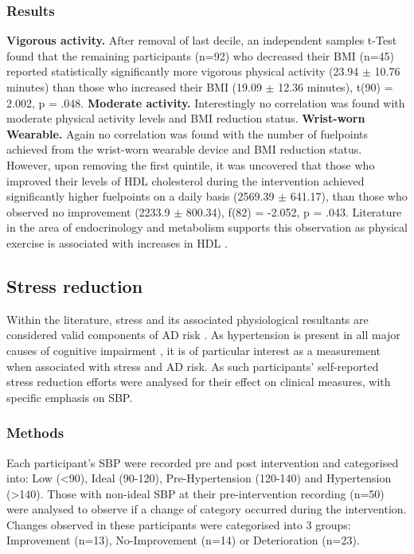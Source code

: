 \subsubsection{Results}
\textbf{Vigorous activity.}
After removal of last decile, an independent samples t-Test found that the remaining participants (n=92) who decreased their BMI (n=45) reported statistically significantly more vigorous physical activity (23.94 $\pm$ 10.76 minutes) than those who increased their BMI (19.09 $\pm$ 12.36 minutes), t(90) = 2.002, p = .048.
\newline \textbf{Moderate activity.}
Interestingly no correlation was found with moderate physical activity levels and BMI reduction status.
\newline \textbf{Wrist-worn Wearable.}
Again no correlation was found with the number of fuelpoints achieved from the wrist-worn wearable device and BMI reduction status.
However, upon removing the first quintile, it was uncovered that those who improved their levels of HDL cholesterol during the intervention achieved significantly higher fuelpoints on a daily basis (2569.39 $\pm$ 641.17), than those who observed no improvement (2233.9 $\pm$ 800.34), f(82) = -2.052, p = .043. Literature in the area of endocrinology and metabolism supports this observation as physical exercise is associated with increases in HDL \cite{Franklin2014}.

\subsection{Stress reduction}
Within the literature, stress and its associated physiological resultants are considered valid components of AD risk \cite{Dotson2010,Royall2012,Boyle2010}. As hypertension is present in all major causes of cognitive impairment \cite{Iadecola2014}, it is of particular interest as a measurement when associated with stress and AD risk. As such participants’ self-reported stress reduction efforts were analysed for their effect on clinical measures, with specific emphasis on SBP.

\subsubsection{Methods}
Each participant’s SBP were recorded pre and post intervention and categorised into: Low (\textless90), Ideal (90-120), Pre-Hypertension (120-140) and Hypertension (\textgreater140). Those with non-ideal SBP at their pre-intervention recording (n=50) were analysed to observe if a change of category occurred during the intervention. Changes observed in these participants were categorised into 3 groups: Improvement (n=13), No-Improvement (n=14) or Deterioration (n=23).

